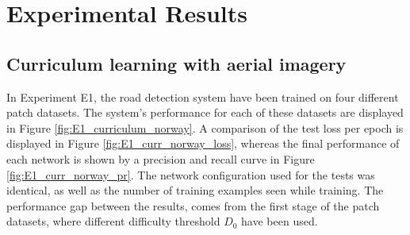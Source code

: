 \section{Experimental Results}
\label{sec:experimentalResults}

\subsection{Curriculum learning with aerial imagery}
\label{sec:results_curriculum_learning_aerial_imagery}

In Experiment E1, the road detection system have been trained on four different patch datasets. The system's performance for each of these datasets are displayed in Figure \ref{fig:E1_curriculum_norway}. A comparison of the test loss per epoch is displayed in Figure \ref{fig:E1_curr_norway_loss}, whereas the final performance of each network is shown by a precision and recall curve in Figure \ref{fig:E1_curr_norway_pr}. The network configuration used for the tests was identical, as well as the number of training examples seen while training. The performance gap between the results, comes from the first stage of the patch datasets, where different difficulty threshold $D_0$ have been used.\\

